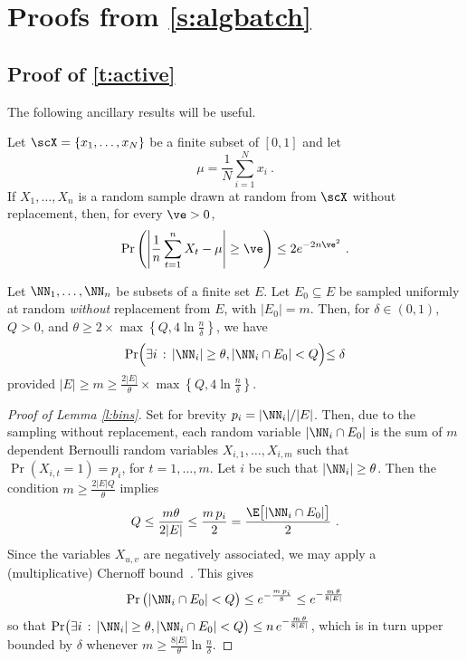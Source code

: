 \section{Proofs from \autoref{s:algbatch}}

\subsection{Proof of \autoref{t:active}}

The following ancillary results will be useful.

\begin{lemma}
\label{l:hoeff-wr}
Let $\scX = \{x_1,\dots,x_N\}$ be a finite subset of $[0,1]$ and let
\[ \mu = \frac{1}{N}\sum_{i=1}^N x_i~.  \]
If $X_1,\dots,X_n$ is a random sample drawn at random from $\scX$ without replacement, then, for
every $\ve > 0$,
\[
  \Pr\left( \left|\frac{1}{n}\sum_{t=1}^n X_t - \mu \right| \ge \ve \right) \le 2e^{-2n\ve^2}~.
\]
\end{lemma}

\begin{lemma}\label{l:bins}
Let $\NN_1, \ldots, \NN_n$ be subsets of a finite set $E$.
Let $E_0 \subseteq E$ be sampled uniformly at random {\em without} replacement from $E$, with $|E_0| = m$. Then, for $\delta \in (0,1)$, $Q > 0$, and $\theta \geq 2\times\max\left\{Q,4\ln \frac{n}{\delta}\right\}$, we have
\[
\Pr\Bigl( \exists i \,:\, |\NN_i| \geq \theta, |\NN_i \cap E_0| < Q\Bigl) \leq \delta
\]
provided $|E| \geq m \geq \frac{2|E|}{\theta}\times\max\left\{Q,4\ln \frac{n}{\delta}\right\}$.
\end{lemma}

\begin{proof}[Proof of Lemma \ref{l:bins}]
Set for brevity $p_i = |\NN_i|/|E|$. Then, due to the sampling without replacement, each random
variable $|\NN_i \cap E_0|$ is the sum of $m$ dependent Bernoulli random variables $X_{i,1}, \ldots,
X_{i,m}$ such that $\Pr(X_{i,t} = 1) = p_i$, for $t = 1, \ldots, m$. Let $i$ be such that $|\NN_i|
\geq \theta$. Then the condition $m \geq \frac{2|E|Q}{\theta}$ implies
\[
Q \leq \frac{m\theta}{2|E|} \leq \frac{m\,p_i}{2} = \frac{\E\big[|\NN_i \cap E_0|\big]}{2}~.
\]
Since the variables $X_{u,v}$ are negatively associated, we may apply a (multiplicative) Chernoff
bound~\autocite[Section~3.1]{dpbook}.
This gives
\[
\Pr\big(|\NN_i \cap E_0| < Q\big) \leq e^{-\frac{m\,p_i}{8}} \leq e^{-\frac{m\,\theta}{8|E|}}
\]
so that
$
\Pr\bigl( \exists i\,:\, |\NN_i| \geq \theta, |\NN_i \cap E_0| < Q\bigr) \leq n\,e^{-\frac{m\,\theta}{8|E|}}
$,
which is in turn upper bounded by $\delta$ whenever 
$m \geq \frac{8|E|}{\theta}\ln \frac{n}{\delta}$. %
\end{proof}


